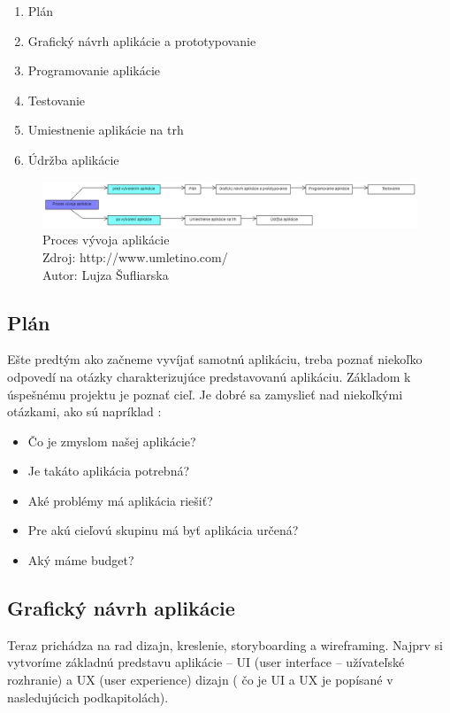 \documentclass[10pt,twoside,slovak,a4paper]{article}
\begin{document}
	\begin{enumerate}
	\item Plán
	\item Grafický návrh aplikácie a prototypovanie
	\item Programovanie aplikácie
	\item Testovanie
	\item Umiestnenie aplikácie na trh
	\item Údržba aplikácie
	\end{enumerate}

\begin{figure}[h!]
\includegraphics[scale=0.35]{proces_vyvoja_aplikacie}
\caption{Proces vývoja aplikácie
\\ Zdroj: http://www.umletino.com/
\\ Autor: Lujza Šufliarska}
\end{figure}



\subsection{Plán} \label{}
\quad Ešte predtým ako začneme vyvíjať samotnú aplikáciu, treba poznať niekoľko odpovedí na otázky charakterizujúce predstavovanú aplikáciu. Základom k úspešnému projektu je poznať cieľ. Je dobré sa zamyslieť nad niekoľkými otázkami, ako sú napríklad \cite{EMM1, Synetech}:
\begin{itemize}
\item  Čo je zmyslom našej aplikácie?
\item  Je takáto aplikácia potrebná?
\item Aké problémy má aplikácia riešiť?
\item Pre akú cieľovú skupinu má byť aplikácia určená?
\item Aký máme budget?
\end{itemize}


\subsection{Grafický návrh aplikácie}
\quad Teraz prichádza na rad dizajn, kreslenie, storyboarding a wireframing. Najprv si vytvoríme základnú predstavu aplikácie – UI (user interface – užívateľské rozhranie) a UX (user experience) dizajn ( čo je UI a UX je popísané v nasledujúcich podkapitolách).
\end{document}
